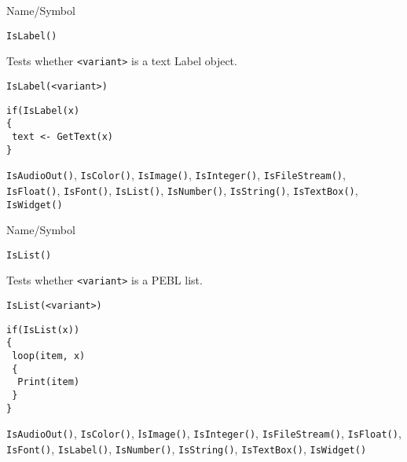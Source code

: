 \rl


\begin{desc}{Name/Symbol}
\item[Name/Symbol]	\verb+IsLabel()+

\item[Description]	Tests whether \verb+<variant>+ is a text Label object.

\item[Usage]		
\begin{verbatim}
IsLabel(<variant>)
\end{verbatim}

\item[Example]	
\begin{verbatim}
if(IsLabel(x)
{
 text <- GetText(x)
}
\end{verbatim}

\item[See Also] \verb+IsAudioOut()+, \verb+IsColor()+,
  \verb+IsImage()+, \verb+IsInteger()+, \verb+IsFileStream()+,
  \verb+IsFloat()+, \verb+IsFont()+, \verb+IsList()+,
  \verb+IsNumber()+, \verb+IsString()+, \verb+IsTextBox()+,
  \verb+IsWidget()+
\end{desc}

\rl


\begin{desc}{Name/Symbol}
\item[Name/Symbol]	\verb+IsList()+

\item[Description]	Tests whether \verb+<variant>+ is a PEBL list.

\item[Usage]
\begin{verbatim}
IsList(<variant>)
\end{verbatim}

\item[Example]	
\begin{verbatim}
if(IsList(x))
{
 loop(item, x)
 {
  Print(item)
 }
}
\end{verbatim}

\item[See Also] \verb+IsAudioOut()+, \verb+IsColor()+,
  I\verb+sImage()+, \verb+IsInteger()+, \verb+IsFileStream()+,
  \verb+IsFloat()+, \verb+IsFont()+, \verb+IsLabel()+,
  \verb+IsNumber()+, \verb+IsString()+, \verb+IsTextBox()+,
  \verb+IsWidget()+
\end{desc}

\rl


